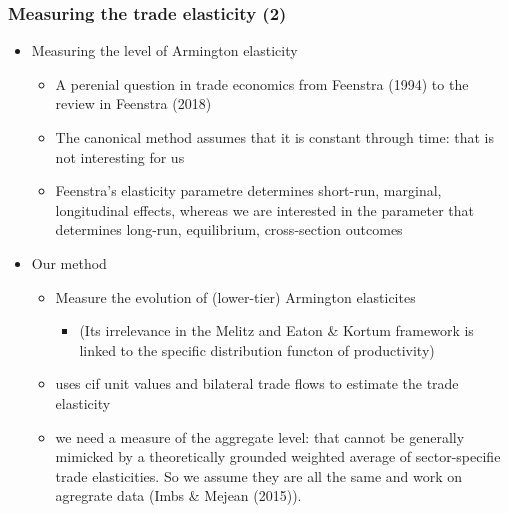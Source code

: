 \documentclass{beamer}
\begin{document}
\begin{frame}\frametitle{Measuring the trade elasticity (2)}	
	\begin{itemize}
		\item Measuring the level of Armington elasticity
		\begin{itemize}
			\item A perenial question in trade economics from Feenstra (1994) to the review in Feenstra (2018)
			\item The canonical method assumes that it is constant through time: that is not interesting for us
			\item Feenstra's elasticity parametre determines short-run, marginal, longitudinal effects, whereas we are interested in the parameter that determines long-run, equilibrium, cross-section outcomes
		\end{itemize}
		\item Our method
		\begin{itemize}
			\item Measure the evolution of (lower-tier) Armington elasticites
			\begin{itemize}
				\item (Its irrelevance in the Melitz and Eaton \& Kortum framework is linked to the specific distribution functon of productivity)
			\end{itemize}
			\item uses cif unit values and bilateral trade flows to estimate the trade elasticity
			\item we need a measure of the aggregate level: that cannot be generally mimicked by a theoretically grounded weighted average of sector-specifie trade elasticities. So we assume they are all the same and work on agregrate data (Imbs \& Mejean (2015)).
		\end{itemize}
	\end{itemize}
\end{frame}	
\end{document}
